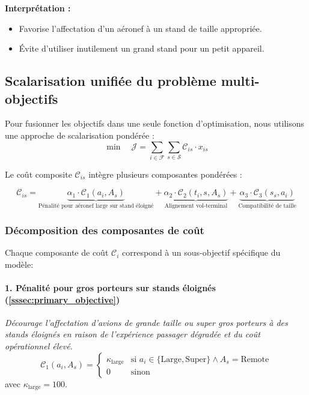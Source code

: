 \noindent\textbf{Interprétation :}
\begin{itemize}[leftmargin=1.7em]
	\item Favorise l’affectation d’un aéronef à un stand de taille appropriée.
	\item Évite d’utiliser inutilement un grand stand pour un petit appareil.
\end{itemize}

\subsection{Scalarisation unifiée du problème multi-objectifs}

Pour fusionner les objectifs dans une seule fonction d’optimisation, nous utilisons une approche de scalarisation pondérée :
\vspace{-0.7em}
\begin{equation}
	\boxed{
		\min \quad \mathcal{J} = \sum_{i \in \mathcal{F}} \sum_{s \in \mathcal{S}} \mathcal{C}_{is} \cdot x_{is}
	}
\end{equation}

\noindent Le coût composite $\mathcal{C}_{is}$ intègre plusieurs composantes pondérées :

\begin{equation}
	\mathcal{C}_{is} = 
	\underbrace{\alpha_1 \cdot \mathcal{C}_1(a_i, A_s)}_{\text{Pénalité pour aéronef large sur stand éloigné}} +
	\underbrace{\alpha_2 \cdot \mathcal{C}_2(t_i, s, A_s)}_{\text{Alignement vol-terminal}} +
	\underbrace{\alpha_3 \cdot \mathcal{C}_3(s_s, a_i)}_{\text{Compatibilité de taille}}
\end{equation}
\subsubsection{Décomposition des composantes de coût}
\label{sssec:cost_breakdown}

Chaque composante de coût $\mathcal{C}_i$ correspond à un sous-objectif spécifique du modèle:

\paragraph{1. Pénalité pour gros porteurs sur stands éloignés (\ref{sssec:primary_objective})}  
\textit{Décourage l’affectation d’avions de grande taille ou super gros porteurs à des stands éloignés en raison de l’expérience passager dégradée et du coût opérationnel élevé.}
	\vspace{-0.7em}
\begin{equation}
	\mathcal{C}_1(a_i, A_s) = 
	\begin{cases}
		\kappa_{\text{large}} & \text{si } a_i \in \{\text{Large}, \text{Super}\} \land A_s = \text{Remote} \\
		0 & \text{sinon}
	\end{cases}
\end{equation}
avec $\kappa_{\text{large}} = 100$.


